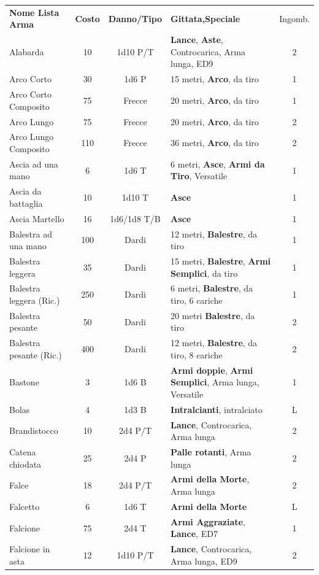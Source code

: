 \documentclass[a4paper,11pt,twoside,openany]{book}
\begin{document}
\begin{tabularx}{1\textwidth}{lccXc}
	\textbf{Nome Lista Arma}& \textbf{Costo} & \textbf{Danno/Tipo} & \textbf{Gittata,Speciale} & Ingomb.\\
	
Alabarda& 10 & 1d10 P/T& \textbf{Lance}, \textbf{Aste}, Controcarica, Arma lunga, ED9 & 2\\
Arco Corto& 30 & 1d6 P& 15 metri, \textbf{Arco}, da tiro& 1\\
Arco Corto Composito& 75 & Frecce& 20 metri, \textbf{Arco}, da tiro& 1\\
Arco Lungo& 75 & Frecce& 20 metri, \textbf{Arco}, da tiro& 2\\
Arco Lungo Composito& 110& Frecce& 36 metri, \textbf{Arco}, da tiro& 2\\
Ascia ad una mano& 6  & 1d6 T& 6 metri, \textbf{Asce}, \textbf{Armi da Tiro}, Versatile& 1\\
Ascia da battaglia& 10 & 1d10 T&\textbf{Asce}& 1\\
Ascia Martello& 16 & 1d6/1d8 T/B& \textbf{Asce}& 1\\
Balestra ad una mano& 100& Dardi& 12 metri, \textbf{Balestre}, da tiro& 1\\
Balestra leggera& 35 & Dardi& 15 metri, \textbf{Balestre}, \textbf{Armi Semplici}, da tiro& 1\\
Balestra leggera (Ric.) & 250& Dardi & 6 metri, \textbf{Balestre}, da tiro, 6 cariche& 1\\
Balestra pesante& 50 & Dardi& 20 metri \textbf{Balestre}, da tiro& 2\\
Balestra pesante (Ric.) & 400& Dardi& 12 metri, \textbf{Balestre}, da tiro, 8 cariche& 2\\
Bastone& 3& 1d6 B& \textbf{Armi doppie}, \textbf{Armi Semplici}, Arma lunga, Versatile& 1\\
Bolas& 4& 1d3 B&\textbf{Intralcianti}, intralciato& L\\
Brandistocco& 10 & 2d4 P/T& \textbf{Lance}, Controcarica, Arma lunga& 2\\
Catena chiodata& 25 & 2d4 P& \textbf{Palle rotanti}, Arma lunga& 2\\
Falce& 18 & 2d4 P/T& \textbf{Armi della Morte}, Arma lunga& 2\\
Falcetto& 6& 1d6 T& \textbf{Armi della Morte} & L\\
Falcione& 75 & 2d4 T& \textbf{Armi Aggraziate}, \textbf{Lance}, ED7& 1\\
Falcione in asta& 12 & 1d10 P/T& \textbf{Lance}, Controcarica, Arma lunga, ED9& 2\\

\end{tabularx}
\end{document}
